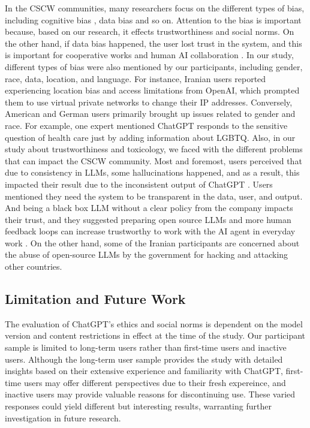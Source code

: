 \documentclass[sigconf]{acmart}
\begin{document}
In the CSCW communities, many researchers focus on the different types of bias, including cognitive bias \cite{10.1145/3584931.3611284}, data bias \cite{10.1145/3462204.3481729} and so on. Attention to the bias is important because, based on our research, it effects trustworthiness and social norms. On the other hand, if data bias happened, the user lost trust in the system, and this is important for cooperative works and human AI collaboration \cite{10.1145/3584931.3611284}. In our study, different types of bias were also mentioned by our participants, including gender, race, data, location, and language. For instance, Iranian users reported experiencing location bias and access limitations from OpenAI, which prompted them to use virtual private networks to change their IP addresses. Conversely, American and German users primarily brought up issues related to gender and race. For example, one expert mentioned ChatGPT responds to the sensitive question of health care just by adding information about LGBTQ. Also, in our study about trustworthiness and toxicology, we faced with the different problems that can impact the CSCW community. Most and foremost, users perceived that due to consistency in LLMs, some hallucinations happened, and as a result, this impacted their result due to the inconsistent output of ChatGPT \cite{10.1145/3584931.3608438}. Users mentioned they need the system to be transparent in the data, user, and output. And being a black box LLM without a clear policy from the company impacts their trust, and they suggested preparing open source LLMs and more human feedback loops can increase trustworthy to work with the AI agent in everyday work \cite{10.1145/3500868.3559450}. On the other hand, some of the Iranian participants are concerned about the abuse of open-source LLMs by the government for hacking and attacking other countries.



\subsection{Limitation and Future Work}


The evaluation of ChatGPT's ethics and social norms is dependent on the model version and content restrictions in effect at the time of the study. Our participant sample is limited to long-term users rather than first-time users and inactive users. Although the long-term user sample provides the study with detailed insights based on their extensive experience and familiarity with ChatGPT, first-time users may offer different perspectives due to their fresh expereince, and inactive users may provide valuable reasons for discontinuing use. These varied responses could yield different but interesting results, warranting further investigation in future research.
\end{document}
